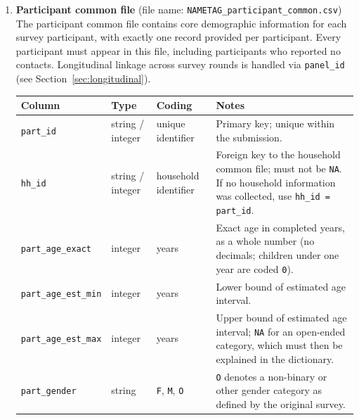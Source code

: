 \documentclass[11pt,a4paper]{article}
\begin{document}
\begin{enumerate}
    \item \textbf{Participant common file} (file name: \texttt{NAMETAG\_participant\_common.csv}) \\
    The participant common file contains core demographic information for each survey participant, with exactly one record provided per participant. Every participant must appear in this file, including participants who reported no contacts. Longitudinal linkage across survey rounds is handled via \texttt{panel\_id} (see Section~\ref{sec:longitudinal}).

    \begin{table}[H]
    \centering
    \label{tab:participant_common}
    \begin{tabularx}{\textwidth}{l l l X}
    \toprule
    \textbf{Column} & \textbf{Type} & \textbf{Coding} & \textbf{Notes} \\
    \midrule
    \texttt{part\_id} & string / integer & unique identifier & Primary key; unique within the submission. \\
    \texttt{hh\_id} & string / integer & household identifier & Foreign key to the household common file; must not be \texttt{NA}. If no household information was collected, use \texttt{hh\_id = part\_id}. \\
    \texttt{part\_age\_exact} &  integer & years &
    Exact age in completed years, as a whole number (no decimals; children under one year are coded \texttt{0}). \\
    \texttt{part\_age\_est\_min} &
    integer &
    years &
    Lower bound of estimated age interval. \\

    \texttt{part\_age\_est\_max} &
    integer &
    years &
    Upper bound of estimated age interval; \texttt{NA} for an open-ended category, which must then be explained in the dictionary. \\

    \texttt{part\_gender} & string & \texttt{F}, \texttt{M}, \texttt{O} & \texttt{O} denotes a non-binary or other gender category as defined by the original survey. \\
    \bottomrule
    \end{tabularx}
    \end{table}


\end{enumerate}
\end{document}
